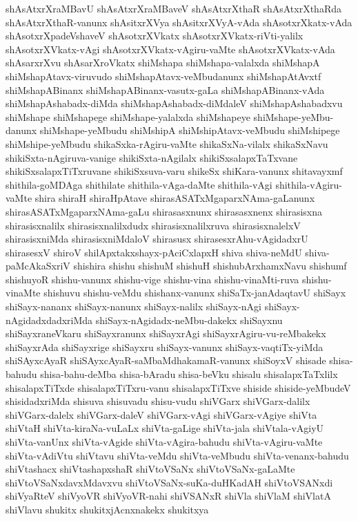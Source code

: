 {shAsAtxrXraMBavU
shAsAtxrXraMBaveV
shAsAtxrXthaR
shAsAtxrXthaRda
shAsAtxrXthaR-vanunx
shAsitxrXVya
shAsitxrXVyA-vAda
shAsotxrXkatx-vAda
shAsotxrXpadeVshaveV
shAsotxrXVkatx
shAsotxrXVkatx-riVti-yalilx
shAsotxrXVkatx-vAgi
shAsotxrXVkatx-vAgiru-vaMte
shAsotxrXVkatx-vAda
shAsarxrXvu
shAsarXroVkatx
shiMshapa
shiMshapa-valalxda
shiMshapA
shiMshapAtavx-viruvudo
shiMshapAtavx-veMbudanunx
shiMshapAtAvxtf
shiMshapABinanx
shiMshapABinanx-vasutx-gaLa
shiMshapABinanx-vAda
shiMshapAshabadx-diMda
shiMshapAshabadx-diMdaleV
shiMshapAshabadxvu
shiMshape
shiMshapege
shiMshape-yalalxda
shiMshapeye
shiMshape-yeMbu-danunx
shiMshape-yeMbudu
shiMshipA
shiMshipAtavx-veMbudu
shiMshipege
shiMshipe-yeMbudu
shikaSxka-rAgiru-vaMte
shikaSxNa-vilalx
shikaSxNavu
shikiSxta-nAgiruva-vanige
shikiSxta-nAgilalx
shikiSxsalapxTaTxvane
shikiSxsalapxTiTxruvane
shikiSxsuva-varu
shikeSx
shiKara-vanunx
shitavayxmf
shithila-goMDAga
shithilate
shithila-vAga-daMte
shithila-vAgi
shithila-vAgiru-vaMte
shira
shiraH
shiraHpAtave
shirasASATxMgaparxNAma-gaLanunx
shirasASATxMgaparxNAma-gaLu
shirasasxnunx
shirasasxnenx
shirasisxna
shirasisxnalilx
shirasisxnalilxdudx
shirasisxnalilxruva
shirasisxnalelxV
shirasisxniMda
shirasisxniMdaloV
shirasusx
shirasesxrAhu-vAgidadxrU
shirasesxV
shiroV
shilApxtakxshayx-pAciCxlapxH
shiva
shiva-neMdU
shiva-paMcAkaSxriV
shishira
shishu
shishuM
shishuH
shishubArxhamxNavu
shishumf
shishuyoR
shishu-vanunx
shishu-vige
shishu-vina
shishu-vinaMti-ruva
shishu-vinaMte
shishuvu
shishu-veMdu
shishanx-vanunx
shiSaTx-janAdaqtavU
shiSayx
shiSayx-nananx
shiSayx-nanunx
shiSayx-nalilx
shiSayx-nAgi
shiSayx-nAgidadxdadxriMda
shiSayx-nAgidadx-neMbu-dakekx
shiSayxnu
shiSayxraneVkaru
shiSayxranunx
shiSayxrAgi
shiSayxrAgiru-vu-reMbakekx
shiSayxrAda
shiSayxrige
shiSayxru
shiSayx-vanunx
shiSayx-vaqtiTx-yiMda
shiSAyxcAyaR
shiSAyxcAyaR-saMbaMdhakamaR-vanunx
shiSoyxV
shisade
shisa-bahudu
shisa-bahu-deMba
shisa-bAradu
shisa-beVku
shisalu
shisalapxTaTxlilx
shisalapxTiTxde
shisalapxTiTxru-vanu
shisalapxTiTxve
shiside
shiside-yeMbudeV
shisidadxriMda
shisuva
shisuvadu
shisu-vudu
shiVGarx
shiVGarx-dalilx
shiVGarx-dalelx
shiVGarx-daleV
shiVGarx-vAgi
shiVGarx-vAgiye
shiVta
shiVtaH
shiVta-kiraNa-vuLaLx
shiVta-gaLige
shiVta-jala
shiVtala-vAgiyU
shiVta-vanUnx
shiVta-vAgide
shiVta-vAgira-bahudu
shiVta-vAgiru-vaMte
shiVta-vAdiVtu
shiVtavu
shiVta-veMdu
shiVta-veMbudu
shiVta-venanx-bahudu
shiVtashacx
shiVtashapxshaR
shiVtoVSaNx
shiVtoVSaNx-gaLaMte
shiVtoVSaNxdavxMdavxvu
shiVtoVSaNx-suKa-duHKadAH
shiVtoVSANxdi
shiVyaRteV
shiVyoVR
shiVyoVR-nahi
shiVSANxR
shiVla
shiVlaM
shiVlatA
shiVlavu
shukitx
shukitxjAcnxnakekx
shukitxya
}

